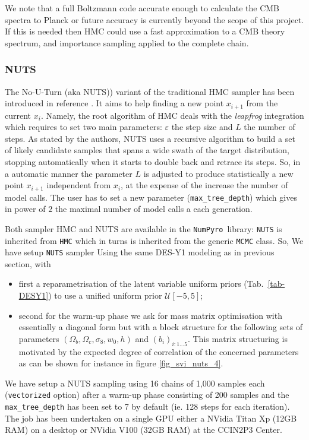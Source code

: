 \documentclass[final,5p,times,twocolumn,authoryear]{elsarticle}
\newcommand{\numpyro}{\texttt{NumPyro}}
\begin{document}
We note that a full Boltzmann code accurate enough to calculate the CMB spectra to Planck \citep{planck18}
or future \citep{s4,simons} accuracy is currently beyond the scope of this project.  
If this is needed then HMC could use a fast approximation to a CMB theory spectrum, and importance sampling applied to the complete chain.

\subsubsection{NUTS}
\label{sec-NUTS}
%

The No-U-Turn (aka NUTS))  variant of the traditional HMC sampler has been introduced in reference \citep{nuts}. It aims to help finding a new point  $x_{i+1}$ from  the current $x_i$. Namely, the root algorithm of HMC deals with the \textit{leapfrog} integration which requires to set two main parameters: $\varepsilon$ the step size and $L$ the number of steps. As stated by the authors, NUTS  uses a recursive algorithm to build a set of likely candidate samples that spans a wide swath of the target distribution, stopping automatically when it starts to double back and retrace its steps. So, in a automatic manner the parameter $L$ is adjusted to produce statistically  a new point $x_{i+1}$ independent from $x_i$, at the expense of the increase the number of model calls. The user has to set a new  parameter  (\texttt{max\_tree\_depth}) which gives in power of $2$ the maximal number of model calls a each generation.

Both sampler HMC and NUTS are available in the \numpyro\ library: \texttt{NUTS} is inherited from \texttt{HMC} which in turns is inherited from the generic \texttt{MCMC} class. So, We have setup \texttt{NUTS} sampler Using the same DES-Y1 modeling as in previous section, with 
\begin{itemize}
    \item first a reparametrisation of the latent variable uniform priors (Tab.~\ref{tab-DESY1}) to use a unified uniform prior $\mathcal{U}[-5,5]$;
    \item second for the warm-up phase we ask for mass matrix optimisation with essentially a diagonal form but with a block structure for the following sets of parameters $(\Omega_b,\Omega_c,\sigma_8,w_0,h)$ and $(b_i)_{i:1\dots5}$. This matrix structuring is motivated by the expected degree of correlation of the concerned parameters as can be shown for instance in figure \ref{fig_svi_nuts_4}.
\end{itemize}
We have setup a NUTS sampling using 16 chains of 1,000 samples each (\texttt{vectorized} option) after a warm-up phase consisting of 200 samples and the \texttt{max\_tree\_depth} has been set to 7 by default (ie. 128 steps for each iteration). The job has been undertaken on a single GPU either a NVidia Titan Xp (12GB RAM) on a desktop or NVidia V100 (32GB RAM) at the CCIN2P3 Center.
\end{document}
